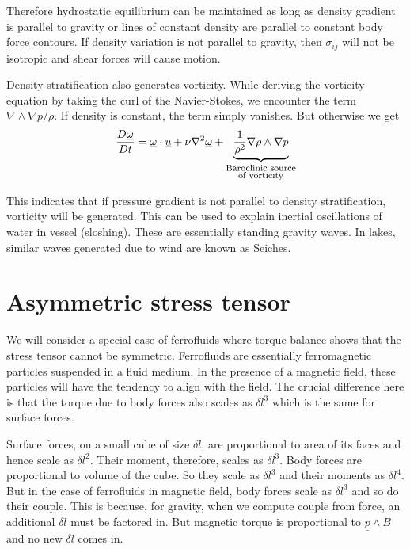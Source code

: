\documentclass[11pt, letterpaper]{article}
\newcommand{\1}{\textbf{1}}
\newcommand{\vect}[1]{\underline{#1}} %
\begin{document}
Therefore hydrostatic equilibrium can be maintained as long as density gradient is parallel to gravity or lines of constant density are parallel to constant body force contours. If density variation is not parallel to gravity, then $\sigma_{ij}$ will not be isotropic and shear forces will cause motion.

Density stratification also generates vorticity. While deriving the vorticity equation by taking the curl of the Navier-Stokes, we encounter the term $\nabla \wedge \nabla p/\rho$. If density is constant, the term simply vanishes. But otherwise we get
\begin{align*}
\frac{D\vect\omega}{Dt} = \vect\omega\cdot\vect u + \nu \nabla^2 \vect \omega + \underbrace{\frac{1}{\rho^2}\nabla\rho \wedge \nabla p}_{\substack{\text{\footnotesize{Baroclinic source}}\\ \text{\footnotesize{of vorticity}}}}
\end{align*}

This indicates that if pressure gradient is not parallel to density stratification, vorticity will be generated. This can be used to explain inertial oscillations of water in vessel (sloshing). These are essentially standing gravity waves. In lakes, similar waves generated due to wind are known as Seiches.

\section{Asymmetric stress tensor}

We will consider a special case of ferrofluids where torque balance shows that the stress tensor cannot be symmetric. Ferrofluids are essentially ferromagnetic particles suspended in a fluid medium. In the presence of a magnetic field, these particles will have the tendency to align with the field. The crucial difference here is that the torque due to body forces also scales as $\delta l^3$ which is the same for surface forces. 

Surface forces, on a small cube of size $\delta l$, are proportional to area of its faces and hence scale as $\delta l^2$. Their moment, therefore, scales as $\delta l^3$. Body forces are proportional to volume of the cube. So they scale as $\delta l^3$ and their moments as $\delta l^4$. But in the case of ferrofluids in magnetic field, body forces scale as $\delta l^3$ and so do their couple. This is because, for gravity, when we compute couple from force, an additional $\delta l$ must be factored in. But magnetic torque is proportional to $\vect p \wedge \vect B$ and no new $\delta l$ comes in.
\end{document}

